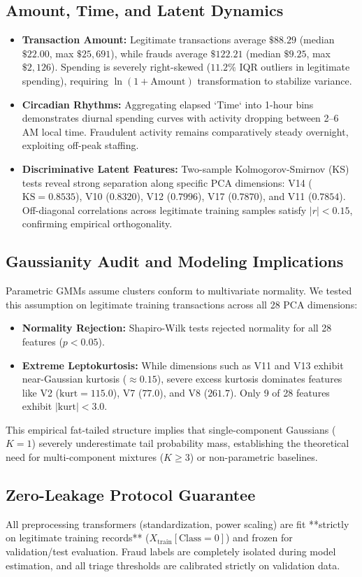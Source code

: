 \subsection{Amount, Time, and Latent Dynamics}
\begin{itemize}
    \item \textbf{Transaction Amount:} Legitimate transactions average $\$88.29$ (median $\$22.00$, max $\$25,691$), while frauds average $\$122.21$ (median $\$9.25$, max $\$2,126$). Spending is severely right-skewed ($11.2\%$ IQR outliers in legitimate spending), requiring $\ln(1 + \text{Amount})$ transformation to stabilize variance.
    \item \textbf{Circadian Rhythms:} Aggregating elapsed `Time` into 1-hour bins demonstrates diurnal spending curves with activity dropping between 2--6 AM local time. Fraudulent activity remains comparatively steady overnight, exploiting off-peak staffing.
    \item \textbf{Discriminative Latent Features:} Two-sample Kolmogorov-Smirnov (KS) tests reveal strong separation along specific PCA dimensions: V14 ($\text{KS} = 0.8535$), V10 ($0.8320$), V12 ($0.7996$), V17 ($0.7870$), and V11 ($0.7854$). Off-diagonal correlations across legitimate training samples satisfy $|r| < 0.15$, confirming empirical orthogonality.
\end{itemize}

\subsection{Gaussianity Audit and Modeling Implications}
Parametric GMMs assume clusters conform to multivariate normality. We tested this assumption on legitimate training transactions across all 28 PCA dimensions:
\begin{itemize}
    \item \textbf{Normality Rejection:} Shapiro-Wilk tests rejected normality for all 28 features ($p < 0.05$).
    \item \textbf{Extreme Leptokurtosis:} While dimensions such as V11 and V13 exhibit near-Gaussian kurtosis ($\approx 0.15$), severe excess kurtosis dominates features like V2 ($\text{kurt} = 115.0$), V7 ($77.0$), and V8 ($261.7$). Only 9 of 28 features exhibit $|\text{kurt}| < 3.0$.
\end{itemize}
This empirical fat-tailed structure implies that single-component Gaussians ($K=1$) severely underestimate tail probability mass, establishing the theoretical need for multi-component mixtures ($K \ge 3$) or non-parametric baselines.

\subsection{Zero-Leakage Protocol Guarantee}
All preprocessing transformers (standardization, power scaling) are fit **strictly on legitimate training records** ($X_{\text{train}}[\text{Class}=0]$) and frozen for validation/test evaluation. Fraud labels are completely isolated during model estimation, and all triage thresholds are calibrated strictly on validation data.
